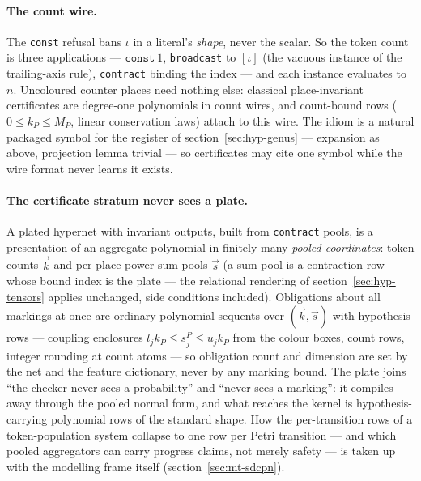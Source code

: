 \paragraph{The count wire.} The \texttt{const} refusal bans $\iota$
in a literal's \emph{shape}, never the scalar. So the token count is
three applications --- $\texttt{const}\ 1$, \texttt{broadcast} to
$[\iota]$ (the vacuous instance of the trailing-axis rule),
\texttt{contract} binding the index --- and each instance evaluates
to $n$. Uncoloured counter places need nothing else: classical
place-invariant certificates are degree-one polynomials in count
wires, and count-bound rows ($0 \le k_P \le M_P$, linear
conservation laws) attach to this wire. The idiom is a natural
packaged symbol for the register of
section~\ref{sec:hyp-genus} --- expansion as above, projection lemma
trivial --- so certificates may cite one symbol while the wire
format never learns it exists.

\paragraph{The certificate stratum never sees a plate.} A plated
hypernet with invariant outputs, built from \texttt{contract} pools,
is a presentation of an aggregate polynomial in finitely many
\emph{pooled coordinates}: token counts $\vec{k}$ and per-place
power-sum pools $\vec{s}$ (a sum-pool is a contraction row whose
bound index is the plate --- the relational rendering of
section~\ref{sec:hyp-tensors} applies unchanged, side conditions
included). Obligations about all markings at once are ordinary
polynomial sequents over $(\vec{k}, \vec{s})$ with
hypothesis rows --- coupling enclosures
$l_j k_P \le s^P_j \le u_j k_P$ from the colour boxes, count rows,
integer rounding at count atoms --- so obligation count and
dimension are set by the net and the feature dictionary, never by
any marking bound. The plate joins ``the checker never sees a
probability'' and ``never sees a marking'': it compiles away through
the pooled normal form, and what reaches the kernel is
hypothesis-carrying polynomial rows of the standard shape. How the
per-transition rows of a token-population system collapse to one
row per Petri transition --- and which pooled aggregators can carry
progress claims, not merely safety --- is taken up with the
modelling frame itself (section~\ref{sec:mt-sdcpn}).

